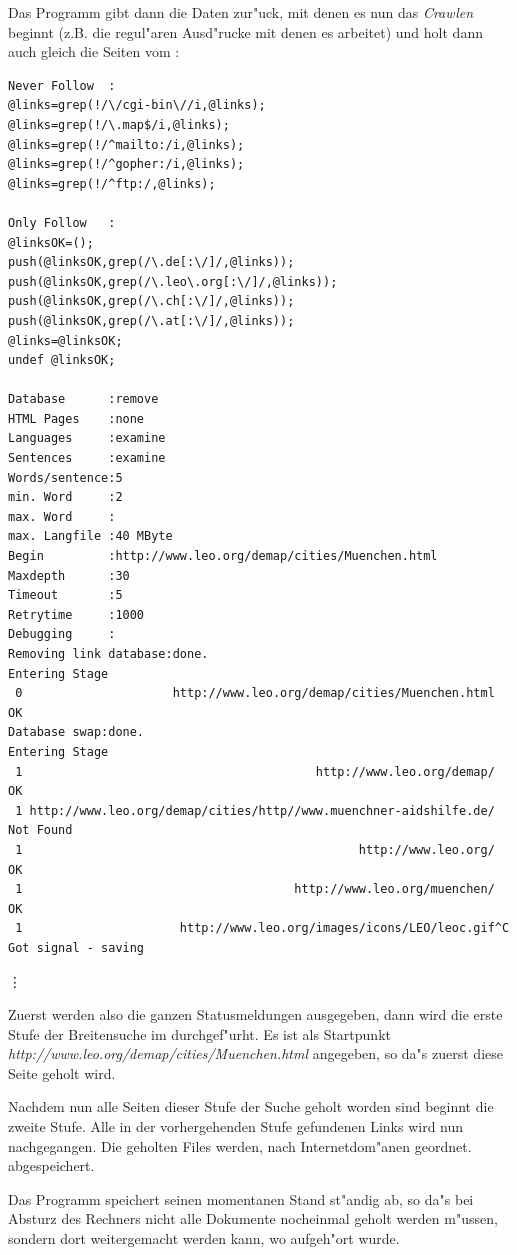 Das Programm gibt dann die Daten zur"uck, mit denen es nun das {\em Crawlen} beginnt (z.B. die regul"aren Ausd"rucke mit denen es arbeitet) und holt dann auch gleich die Seiten vom \www:
{\small
\begin{verbatim}
Never Follow  :
@links=grep(!/\/cgi-bin\//i,@links);
@links=grep(!/\.map$/i,@links);
@links=grep(!/^mailto:/i,@links);
@links=grep(!/^gopher:/i,@links);
@links=grep(!/^ftp:/,@links);

Only Follow   :
@linksOK=();
push(@linksOK,grep(/\.de[:\/]/,@links));
push(@linksOK,grep(/\.leo\.org[:\/]/,@links));
push(@linksOK,grep(/\.ch[:\/]/,@links));
push(@linksOK,grep(/\.at[:\/]/,@links));
@links=@linksOK;
undef @linksOK;

Database      :remove
HTML Pages    :none
Languages     :examine
Sentences     :examine
Words/sentence:5
min. Word     :2
max. Word     :
max. Langfile :40 MByte
Begin         :http://www.leo.org/demap/cities/Muenchen.html
Maxdepth      :30
Timeout       :5
Retrytime     :1000
Debugging     :
Removing link database:done.
Entering Stage 
 0                     http://www.leo.org/demap/cities/Muenchen.html OK
Database swap:done.
Entering Stage 
 1                                         http://www.leo.org/demap/ OK
 1 http://www.leo.org/demap/cities/http//www.muenchner-aidshilfe.de/ Not Found
 1                                               http://www.leo.org/ OK
 1                                      http://www.leo.org/muenchen/ OK
 1                      http://www.leo.org/images/icons/LEO/leoc.gif^C
Got signal - saving
\end{verbatim}
\vdots
}

Zuerst werden also die ganzen Statusmeldungen ausgegeben, dann wird die erste Stufe der Breitensuche im \www durchgef"urht. Es ist als Startpunkt {\em http://www.leo.org/demap/cities/Muenchen.html} angegeben, so da"s zuerst diese Seite geholt wird.

Nachdem nun alle Seiten dieser Stufe der Suche geholt worden sind beginnt die zweite Stufe. Alle in der vorhergehenden Stufe gefundenen Links wird nun nachgegangen. Die geholten Files werden, nach Internetdom"anen geordnet. abgespeichert. 

Das Programm speichert seinen momentanen Stand st"andig ab, so da"s bei Absturz des Rechners nicht alle Dokumente nocheinmal geholt werden m"ussen, sondern dort weitergemacht werden kann, wo aufgeh"ort wurde.


